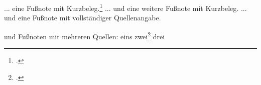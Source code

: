 \documentclass[12pt,a5paper]{article}
\begin{document}
... eine Fußnote mit Kurzbeleg.\footcite[2]{Oechsner.2015}
... und eine weitere Fußnote mit Kurzbeleg\autocite[2]{Oechsner.2015}.
... und eine Fußnote mit vollständiger Quellenangabe. 

und Fußnoten mit mehreren Quellen: eins\autocite{Muster.2020, Oechsner.2015} zwei\footcite{Muster.2020, Oechsner.2015} drei
\end{document}
